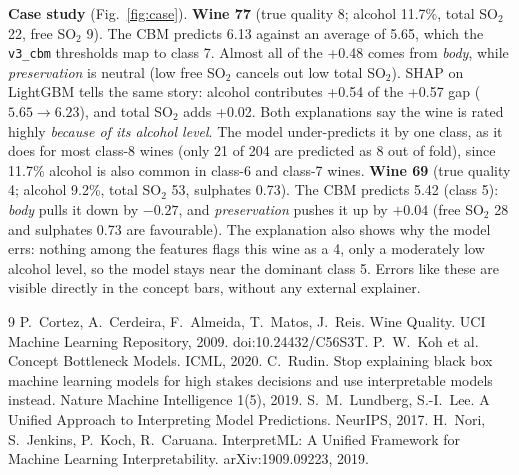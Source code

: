 \documentclass[10pt,a4paper]{article}
\newcommand{\sub}[1]{\par\vspace{2pt}\textbf{\color{navy}#1}\quad}
\begin{document}
\sub{Case study} (Fig.~\ref{fig:case}). \textbf{Wine 77} (true quality 8; alcohol 11.7\%, total SO$_2$ 22, free SO$_2$ 9). The CBM predicts 6.13 against an average of 5.65, which the \texttt{v3\_cbm} thresholds map to class 7. Almost all of the +0.48 comes from \emph{body}, while \emph{preservation} is neutral (low free SO$_2$ cancels out low total SO$_2$). SHAP on LightGBM tells the same story: alcohol contributes +0.54 of the +0.57 gap ($5.65\rightarrow6.23$), and total SO$_2$ adds +0.02. Both explanations say the wine is rated highly \emph{because of its alcohol level}. The model under-predicts it by one class, as it does for most class-8 wines (only 21 of 204 are predicted as 8 out of fold), since 11.7\% alcohol is also common in class-6 and class-7 wines. \textbf{Wine 69} (true quality 4; alcohol 9.2\%, total SO$_2$ 53, sulphates 0.73). The CBM predicts 5.42 (class 5): \emph{body} pulls it down by $-0.27$, and \emph{preservation} pushes it up by $+0.04$ (free SO$_2$ 28 and sulphates 0.73 are favourable). The explanation also shows why the model errs: nothing among the features flags this wine as a 4, only a moderately low alcohol level, so the model stays near the dominant class 5. Errors like these are visible directly in the concept bars, without any external explainer.

\vspace{2pt}
{\small
\renewcommand{\refname}{\color{navy}\large References}
\begin{thebibliography}{9}\setlength{\itemsep}{0pt}\setlength{\parskip}{0pt}
 P.~Cortez, A.~Cerdeira, F.~Almeida, T.~Matos, J.~Reis. Wine Quality. UCI Machine Learning Repository, 2009. doi:10.24432/C56S3T.
 P.~W.~Koh et al. Concept Bottleneck Models. ICML, 2020.
 C.~Rudin. Stop explaining black box machine learning models for high stakes decisions and use interpretable models instead. Nature Machine Intelligence 1(5), 2019.
 S.~M.~Lundberg, S.-I.~Lee. A Unified Approach to Interpreting Model Predictions. NeurIPS, 2017.
 H.~Nori, S.~Jenkins, P.~Koch, R.~Caruana. InterpretML: A Unified Framework for Machine Learning Interpretability. arXiv:1909.09223, 2019.
\end{thebibliography}}
\end{document}
